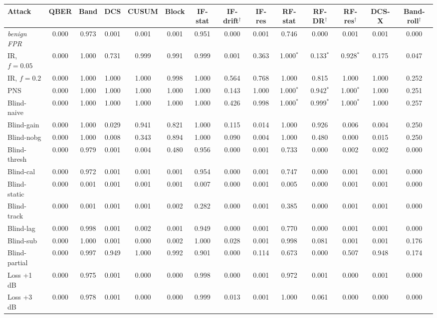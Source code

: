 \begin{tabular}{lccccccccccccc}
\hline
Attack & QBER & Band & DCS & CUSUM & Block & IF-stat & IF-drift$^\dagger$ & IF-res & RF-stat & RF-DR$^\dagger$ & RF-res$^\dagger$ & DCS-X & Band-roll$^\dagger$\\
\hline
\emph{benign FPR} & 0.000 & 0.973 & 0.001 & 0.001 & 0.001 & 0.951 & 0.000 & 0.001 & 0.746 & 0.000 & 0.001 & 0.001 & 0.000\\
IR, $f=0.05$ & 0.000 & 1.000 & 0.731 & 0.999 & 0.991 & 0.999 & 0.001 & 0.363 & 1.000$^*$ & 0.133$^*$ & 0.928$^*$ & 0.175 & 0.047\\
IR, $f=0.2$ & 0.000 & 1.000 & 1.000 & 1.000 & 0.998 & 1.000 & 0.564 & 0.768 & 1.000 & 0.815 & 1.000 & 1.000 & 0.252\\
PNS & 0.000 & 1.000 & 1.000 & 1.000 & 1.000 & 1.000 & 0.143 & 1.000 & 1.000$^*$ & 0.942$^*$ & 1.000$^*$ & 1.000 & 0.251\\
Blind-naive & 0.000 & 1.000 & 1.000 & 1.000 & 1.000 & 1.000 & 0.426 & 0.998 & 1.000$^*$ & 0.999$^*$ & 1.000$^*$ & 1.000 & 0.257\\
Blind-gain & 0.000 & 1.000 & 0.029 & 0.941 & 0.821 & 1.000 & 0.115 & 0.014 & 1.000 & 0.926 & 0.006 & 0.004 & 0.250\\
Blind-nobg & 0.000 & 1.000 & 0.008 & 0.343 & 0.894 & 1.000 & 0.090 & 0.004 & 1.000 & 0.480 & 0.000 & 0.015 & 0.250\\
Blind-thresh & 0.000 & 0.979 & 0.001 & 0.004 & 0.480 & 0.956 & 0.000 & 0.001 & 0.733 & 0.000 & 0.002 & 0.002 & 0.000\\
Blind-cal & 0.000 & 0.972 & 0.001 & 0.001 & 0.001 & 0.954 & 0.000 & 0.001 & 0.747 & 0.000 & 0.001 & 0.001 & 0.000\\
Blind-static & 0.000 & 0.001 & 0.001 & 0.001 & 0.001 & 0.007 & 0.000 & 0.001 & 0.005 & 0.000 & 0.001 & 0.001 & 0.000\\
Blind-track & 0.000 & 0.001 & 0.001 & 0.001 & 0.002 & 0.282 & 0.000 & 0.001 & 0.385 & 0.000 & 0.001 & 0.001 & 0.000\\
Blind-lag & 0.000 & 0.998 & 0.001 & 0.002 & 0.001 & 0.949 & 0.000 & 0.001 & 0.770 & 0.000 & 0.001 & 0.001 & 0.000\\
Blind-sub & 0.000 & 1.000 & 0.001 & 0.000 & 0.002 & 1.000 & 0.028 & 0.001 & 0.998 & 0.081 & 0.001 & 0.001 & 0.176\\
Blind-partial & 0.000 & 0.997 & 0.949 & 1.000 & 0.992 & 0.901 & 0.000 & 0.114 & 0.673 & 0.000 & 0.507 & 0.948 & 0.174\\
Loss +1 dB & 0.000 & 0.975 & 0.001 & 0.000 & 0.000 & 0.998 & 0.000 & 0.001 & 0.972 & 0.001 & 0.000 & 0.001 & 0.000\\
Loss +3 dB & 0.000 & 0.978 & 0.001 & 0.000 & 0.000 & 0.999 & 0.013 & 0.001 & 1.000 & 0.061 & 0.000 & 0.000 & 0.000\\
\hline
\end{tabular}